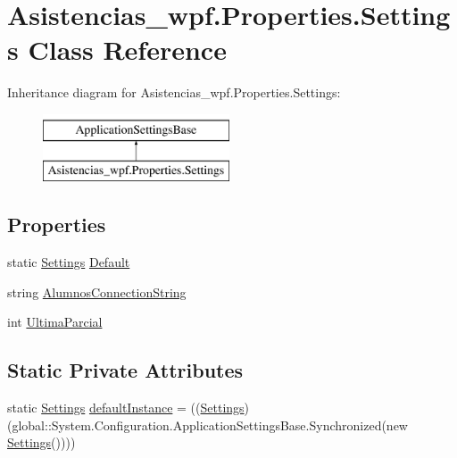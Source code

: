\hypertarget{class_asistencias__wpf_1_1_properties_1_1_settings}{\section{Asistencias\-\_\-wpf.\-Properties.\-Settings Class Reference}
\label{class_asistencias__wpf_1_1_properties_1_1_settings}
}
Inheritance diagram for Asistencias\-\_\-wpf.\-Properties.\-Settings\-:\begin{figure}[H]
\begin{center}
\leavevmode
\includegraphics[height=2.000000cm]{de/d6d/class_asistencias__wpf_1_1_properties_1_1_settings}
\end{center}
\end{figure}
\subsection*{Properties}
\begin{DoxyCompactItemize}
\item 
static \hyperlink{class_asistencias__wpf_1_1_properties_1_1_settings}{Settings} \hyperlink{class_asistencias__wpf_1_1_properties_1_1_settings_adda8dc133197e0813e029711e37bb30f}{Default}
\item 
string \hyperlink{class_asistencias__wpf_1_1_properties_1_1_settings_a91e7c9a0cab95ea486d06d98a5152432}{Alumnos\-Connection\-String}
\item 
int \hyperlink{class_asistencias__wpf_1_1_properties_1_1_settings_a836e31c2aacc9782289d0594f392267a}{Ultima\-Parcial}
\end{DoxyCompactItemize}
\subsection*{Static Private Attributes}
\begin{DoxyCompactItemize}
\item 
static \hyperlink{class_asistencias__wpf_1_1_properties_1_1_settings}{Settings} \hyperlink{class_asistencias__wpf_1_1_properties_1_1_settings_aa4bd314d77e181189954ca60be029aff}{default\-Instance} = ((\hyperlink{class_asistencias__wpf_1_1_properties_1_1_settings}{Settings})(global\-::\-System.\-Configuration.\-Application\-Settings\-Base.\-Synchronized(new \hyperlink{class_asistencias__wpf_1_1_properties_1_1_settings}{Settings}())))
\end{DoxyCompactItemize}


